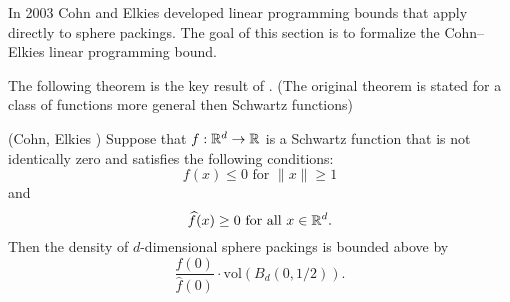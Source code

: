 In 2003 Cohn and Elkies \cite{ElkiesCohn}  developed  linear programming bounds that apply directly to sphere packings. The goal of this section is to formalize the Cohn--Elkies linear programming bound.

The following theorem is the key result of \cite{ElkiesCohn}. (The original theorem is stated for a   class of functions more general then Schwartz functions)
\begin{theorem}\label{thm-Cohn-Elkies}\notready
  (Cohn, Elkies \cite{ElkiesCohn}) Suppose that  $f:\mathbb{R}^d\to\mathbb{R}$ is a Schwartz function that is not identically zero and satisfies the following conditions:
  \begin{equation}\label{eqn-Cohn-Elkies-condition-1}f(x)\leq 0\mbox{ for } \|x\|\geq 1\end{equation} and
  \begin{equation}\label{eqn-Cohn-Elkies-condition-2}\widehat{f}(x)\geq0\mbox{ for all } x\in\mathbb{R}^d.\end{equation}
    Then the density of $d$-dimensional
    sphere packings is bounded above by $$\frac{f(0)}{\widehat{f}(0)}\cdot \mathrm{vol}(B_d(0,1/2)).$$
  \end{theorem}
